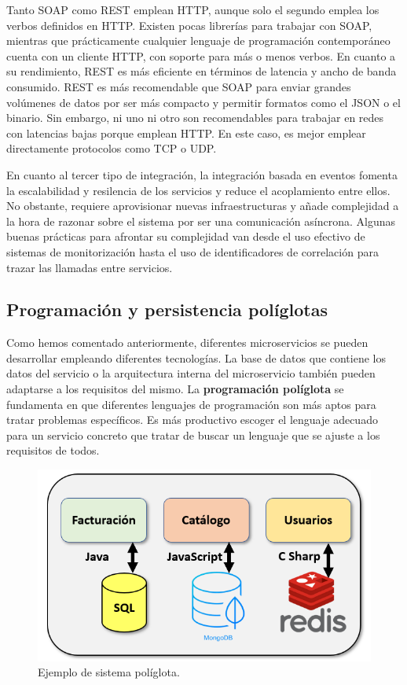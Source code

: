 \documentclass[11pt,spanish,listoffigures]{tfgetsinf}
\begin{document}
Tanto SOAP como REST emplean HTTP, aunque solo el segundo emplea los verbos definidos en HTTP. Existen pocas librerías para trabajar con SOAP, mientras que prácticamente cualquier lenguaje de programación contemporáneo cuenta con un cliente HTTP, con soporte para más o menos verbos. En cuanto a su rendimiento, REST es más eficiente en términos de latencia y ancho de banda consumido. \cite{Mulligan} REST es más recomendable que SOAP para enviar grandes volúmenes de datos por ser más compacto y permitir formatos como el JSON o el binario. Sin embargo, ni uno ni otro son recomendables para trabajar en redes con latencias bajas porque emplean HTTP. En este caso, es mejor emplear directamente protocolos como TCP o UDP. 

En cuanto al tercer tipo de integración, la integración basada en eventos fomenta la escalabilidad y resilencia de los servicios y reduce el acoplamiento entre ellos. No obstante, requiere aprovisionar nuevas infraestructuras y añade complejidad a la hora de razonar sobre el sistema por ser una comunicación asíncrona. Algunas buenas prácticas para afrontar su complejidad van desde el uso efectivo de sistemas de monitorización hasta el uso de identificadores de correlación para trazar las llamadas entre servicios. \cite{Newman2015a}

\subsection{Programación y persistencia políglotas} \label{subsec:Poliglota}

Como hemos comentado anteriormente, diferentes microservicios se pueden desarrollar empleando diferentes tecnologías. La base de datos que contiene los datos del servicio o la arquitectura interna del microservicio también pueden adaptarse a los requisitos del mismo. \cite{DelaTorre2018} La \textbf{programación políglota} se fundamenta en que diferentes lenguajes de programación son más aptos para tratar problemas específicos. Es más productivo escoger el lenguaje adecuado para un servicio concreto que tratar de buscar un lenguaje que se ajuste a los requisitos de todos.

\begin{figure}[h]
\centering
\includegraphics[scale=0.65]{poliglota}
\caption{Ejemplo de sistema políglota.}
\end{figure}
\end{document}
